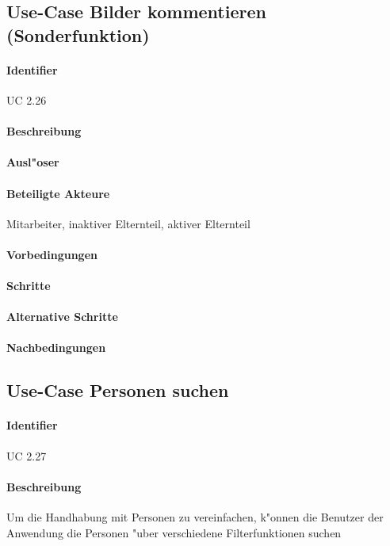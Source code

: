   
  \newpage
 \subsection{Use-Case Bilder kommentieren (Sonderfunktion)}
  \paragraph{Identifier}
  UC 2.26
  \paragraph{Beschreibung}
  \paragraph{Ausl"oser}
  \paragraph{Beteiligte Akteure}   \leavevmode \newline
    Mitarbeiter, inaktiver Elternteil, aktiver Elternteil
  \paragraph{Vorbedingungen}
  \paragraph{Schritte}
  \paragraph{Alternative Schritte}
  \paragraph{Nachbedingungen}

  
  \newpage
 \subsection{Use-Case Personen suchen}
  \paragraph{Identifier}
  UC 2.27
  \paragraph{Beschreibung}
  Um die Handhabung mit Personen zu vereinfachen, k"onnen die Benutzer der Anwendung die Personen "uber verschiedene Filterfunktionen suchen
